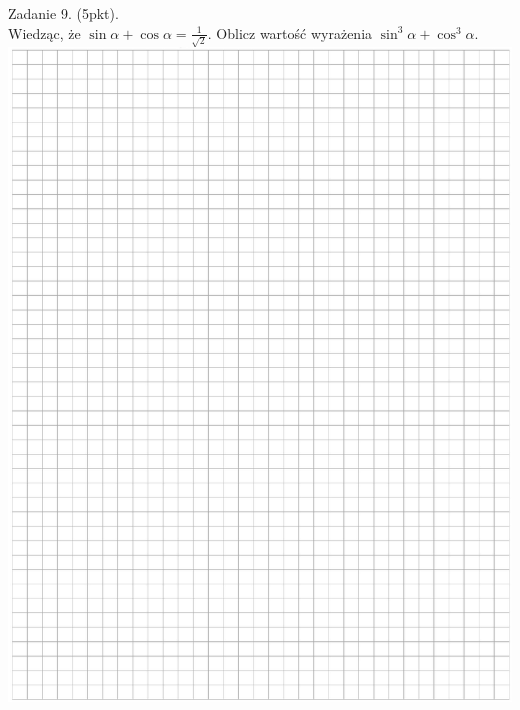 \documentclass[10pt]{article}
\begin{document}
Zadanie 9. (5pkt).\\
Wiedząc, że \(\sin \alpha+\cos \alpha=\frac{1}{\sqrt{2}}\). Oblicz wartość wyrażenia \(\sin ^{3} \alpha+\cos ^{3} \alpha\).\\
\includegraphics[max width=\textwidth, center]{2024_11_21_439e1d90cd1e7f928ae2g-07}
\end{document}
